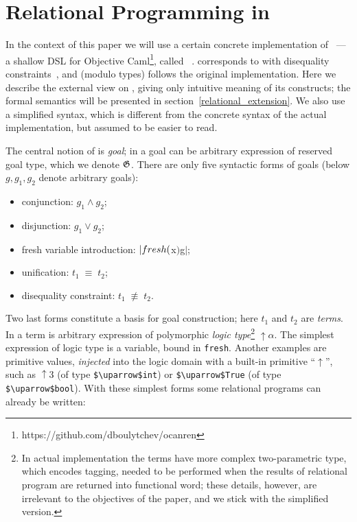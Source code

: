\section{Relational Programming in \miniKanren}
\label{ocanren}

In the context of this paper we will use a certain concrete implementation of ~--- a shallow DSL for Objective 
Caml\footnote{https://github.com/dboulytchev/ocanren}, called \ocanren~\cite{ocanren}. \ocanren corresponds to \miniKanren with
disequality constraints~\cite{CKanren}, and (modulo types) follows the original implementation. Here we describe the external view 
on \ocanren, giving only intuitive meaning of its constructs; the formal semantics will be presented in section~\ref{relational_extension}.
We also use a simplified syntax, which is different from the concrete syntax of the actual implementation, but assumed to
be easier to read.

The central notion of \miniKanren is \emph{goal}; in \ocanren a goal can be arbitrary expression of reserved goal type, which we denote $\mathfrak G$.
There are only five syntactic forms of goals (below $g, g_1, g_2$ denote arbitrary goals):

\begin{itemize}
  \item conjunction: $g_1\wedge g_2$;
  \item disjunction: $g_1\vee g_2$;
  \item fresh variable introduction: $\lstinline|fresh ($x$) $\;g$|$;
  \item unification: $t_1\;\equiv\;t_2$;
  \item disequality constraint: $t_1\;\not\equiv\;t_2$.
\end{itemize}

Two last forms constitute a basis for goal construction; here $t_1$ and $t_2$ are \emph{terms}. In \ocanren a term is
arbitrary expression of polymorphic \emph{logic type}\footnote{In actual 
implementation the terms have more complex two-parametric type, which encodes tagging, needed to be performed when the results of
relational program are returned into functional word; these details, however, are irrelevant to the objectives of the paper, and we stick with the 
simplified version.} $\uparrow\!\alpha$. The simplest expression of logic type is a variable, bound in \lstinline|fresh|. Another examples are primitive values, \emph{injected} 
into the logic domain with a built-in primitive ``$\uparrow$'', such as $\uparrow\!3$ (of type \lstinline|$\uparrow$int|) or \lstinline|$\uparrow$True| 
(of type \lstinline|$\uparrow$bool|). With these simplest forms some relational programs can already be written:

